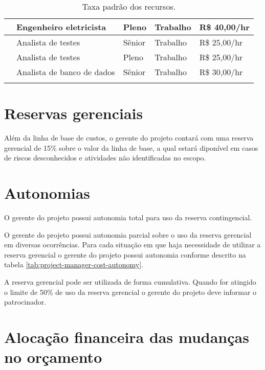 \begin{longtable}{ p{} p{} l l l }
	\midrule
	\elecEngName{}        & Engenheiro eletricista     & Pleno                & Trabalho      & R\$ 40,00/hr          \\
	\midrule
	\testAnalOneName{}    & Analista de testes         & Sênior              & Trabalho      & R\$ 25,00/hr          \\
	\midrule
	\testAnalTwoName{}    & Analista de testes         & Pleno                & Trabalho      & R\$ 25,00/hr          \\
	\midrule
	\dbAnalName{}         & Analista de banco de dados & Sênior              & Trabalho      & R\$ 30,00/hr          \\
	\bottomrule
	\caption{Taxa padrão dos recursos.}
	\centering
\end{longtable}



\section{Reservas gerenciais}

Além da linha de base de custos, o gerente do projeto contará com uma reserva gerencial de 15\% sobre o valor da linha de base, a qual estará diponível em casos de riscos desconhecidos e atividades não identificadas no escopo.

\section{Autonomias}

O gerente do projeto possui autonomia total para uso da reserva contingencial.

O gerente do projeto possui autonomia parcial sobre o uso da reserva gerencial em diversas ocorrências. Para cada situação em que haja necessidade de utilizar a reserva gerencial o gerente do projeto possui autonomia conforme descrito na tabela \ref{tab:project-manager-cost-autonomy}.


A reserva gerencial pode ser utilizada de forma cumulativa. Quando for atingido o limite de 50\% de uso da reserva gerencial o gerente do projeto deve informar o patrocinador.

\section{Alocação financeira das mudanças no orçamento}

